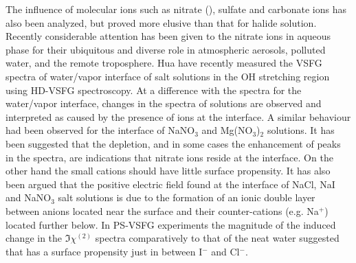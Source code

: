 The influence of molecular ions such as nitrate (\nitrate), sulfate­ and 
carbonate ions­ has also been analyzed, but proved more elusive than that for halide solution\cite{SG05,Salvador2003}.
Recently considerable attention has been given to the nitrate ions in aqueous phase 
for their ubiquitous and diverse role in atmospheric aerosols, polluted water, 
and the remote troposphere\cite{Pitts2000,XuM2009,Jubb2012,Banerjee2016,Yadav2017b,Cochran2017,Yadav2017,Robinson2020}.
Hua \etal\cite{HuaWei2014} have recently measured the VSFG spectra of water/vapor interface of \LiN salt solutions in the OH stretching region
using HD-VSFG spectroscopy\cite{HuaWei2011,HuaWei2011b,ChenXiangKe2010}. 
At a difference with the spectra for the water/vapor interface, changes in the spectra of 
\LiN solutions are observed and interpreted as caused by the presence of ions at the interface.  
A similar behaviour had been observed for the interface of NaNO$_3$ and 
Mg(NO$_3$)$_2$ solutions\cite{Jubb2012,HuaWei2014}. 
It has been suggested that the depletion, and in some cases 
the enhancement of peaks in the spectra, are indications that nitrate 
ions reside at the interface. On the other hand the small 
cations should have little surface propensity. 
It has also been argued that the positive electric field found at the interface of NaCl, NaI and 
NaNO$_3$ salt solutions is due to the formation of an ionic double layer 
between anions located near the surface and their counter-cations (e.g.
Na$^+$) located further below. In PS-VSFG experiments the 
magnitude of the induced change in the $\Im\chi^{(2)}$ spectra comparatively
to that of the neat water suggested that \nitrate has a surface propensity 
just in between I$^-$ and Cl$^-$\cite{Verreault2013,Verreault2009}. 


